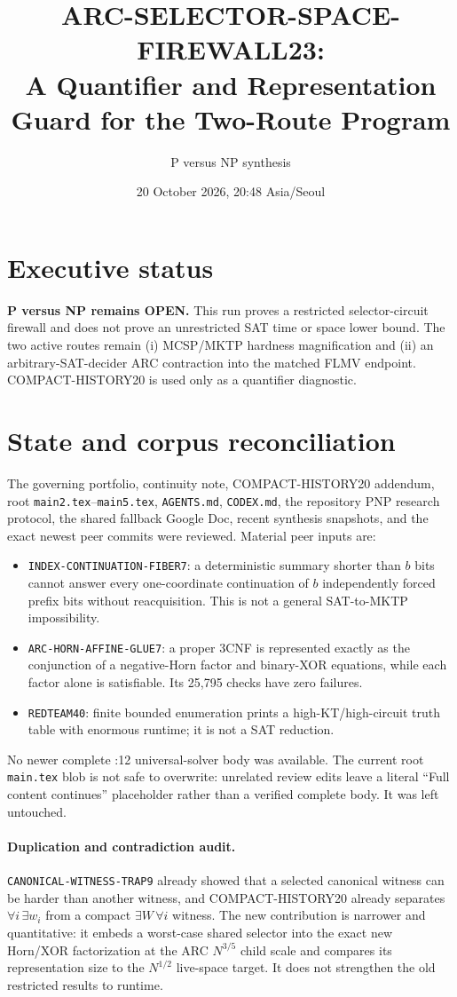 \documentclass[11pt]{article}
\title{ARC-SELECTOR-SPACE-FIREWALL23:\\A Quantifier and Representation Guard for the Two-Route Program}
\author{P versus NP synthesis}
\date{20 October 2026, 20:48 Asia/Seoul}
\begin{document}
\maketitle

\section*{Executive status}
\textbf{P versus NP remains OPEN.}  This run proves a restricted selector-circuit
firewall and does not prove an unrestricted SAT time or space lower bound.  The
two active routes remain (i) MCSP/MKTP hardness magnification and (ii) an
arbitrary-SAT-decider ARC contraction into the matched FLMV endpoint.
COMPACT-HISTORY20 is used only as a quantifier diagnostic.

\section*{State and corpus reconciliation}
The governing portfolio, continuity note, COMPACT-HISTORY20 addendum, root
\texttt{main2.tex}--\texttt{main5.tex}, \texttt{AGENTS.md},
\texttt{CODEX.md}, the repository PNP research protocol, the shared fallback
Google Doc, recent synthesis snapshots, and the exact newest peer commits were
reviewed.  Material peer inputs are:
\begin{itemize}
\item \texttt{INDEX-CONTINUATION-FIBER7}: a deterministic summary shorter than
  $b$ bits cannot answer every one-coordinate continuation of $b$ independently
  forced prefix bits without reacquisition.  This is not a general SAT-to-MKTP
  impossibility.
\item \texttt{ARC-HORN-AFFINE-GLUE7}: a proper 3CNF is represented exactly as
  the conjunction of a negative-Horn factor and binary-XOR equations, while
  each factor alone is satisfiable.  Its 25,795 checks have zero failures.
\item \texttt{REDTEAM40}: finite bounded enumeration prints a high-KT/high-circuit
  truth table with enormous runtime; it is not a SAT reduction.
\end{itemize}
No newer complete :12 universal-solver body was available.  The current root
\texttt{main.tex} blob is not safe to overwrite: unrelated review edits leave a
literal ``Full content continues'' placeholder rather than a verified complete
body.  It was left untouched.

\paragraph{Duplication and contradiction audit.}
\texttt{CANONICAL-WITNESS-TRAP9} already showed that a selected canonical
witness can be harder than another witness, and COMPACT-HISTORY20 already
separates $\forall i\,\exists w_i$ from a compact $\exists W\,\forall i$ witness.
The new contribution is narrower and quantitative: it embeds a worst-case
shared selector into the exact new Horn/XOR factorization at the ARC
$N^{3/5}$ child scale and compares its representation size to the
$N^{1/2}$ live-space target.  It does not strengthen the old restricted results
to runtime.
\end{document}
